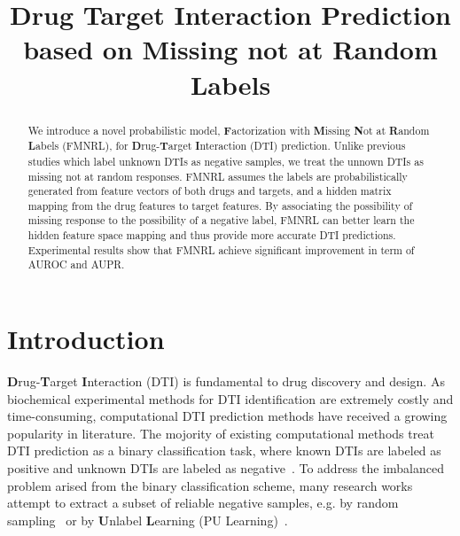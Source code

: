 \documentclass[sigconf,anonymous]{acmart}
\begin{document}
\title{Drug Target Interaction Prediction based on Missing not at Random Labels}

\begin{abstract}
We introduce a novel probabilistic model, \textbf{F}actorization with \textbf{M}issing \textbf{N}ot at \textbf{R}andom \textbf{L}abels (FMNRL), for \textbf{D}rug-\textbf{T}arget \textbf{I}nteraction (DTI) prediction. Unlike previous studies which label unknown DTIs as negative samples, we treat the unnown DTIs as missing not at random responses. FMNRL assumes the labels are probabilistically generated from feature vectors of both drugs and targets, and a hidden matrix mapping from the drug features to target features. By associating the possibility of missing response to the possibility of a negative label, FMNRL can better learn the hidden feature space mapping and thus provide more accurate DTI predictions. Experimental results show that FMNRL achieve significant improvement in term of AUROC and AUPR. 

\end{abstract}


\keywords{}

\maketitle
\section{Introduction}\label{sec:introduction}
\textbf{D}rug-\textbf{T}arget \textbf{I}nteraction (DTI) is fundamental to drug discovery and design. As biochemical experimental methods for DTI identification are extremely costly and time-consuming, computational DTI prediction methods have received a growing popularity in literature. The mojority of existing computational methods treat DTI prediction as a binary classification task, where known DTIs are labeled as positive and unknown DTIs are labeled as negative~\cite{}. To address the imbalanced problem arised from the binary classification scheme, many research works attempt to extract a subset of reliable negative samples, e.g. by random sampling~\cite{Luo2017Network} or by \textbf{U}nlabel \textbf{L}earning (PU Learning)~\cite{Peng2017Screening}. 
\end{document}

